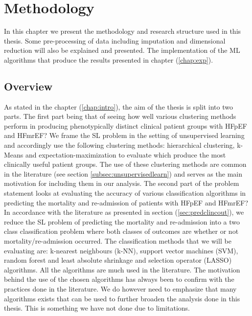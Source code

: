 \documentclass[../thesis.tex]{subfiles}
\begin{document}
\chapter{Methodology}
\label{chap:method}

\noindent In this chapter we present the methodology and research structure used in this thesis. Some pre-processing of data including imputation and dimensional reduction will also be explained and presented. The implementation of the ML algorithms that produce the results presented in chapter (\ref{chap:exp}).

\section{Overview}

\noindent As stated in the chapter (\ref{chap:intro}), the aim of the thesis is split into two parts. The first part being that of seeing how well various clustering methods perform in producing phenotypically distinct clinical patient groups with HFpEF and HFmrEF? We frame the SL problem in the setting of unsupervised learning and accordingly use the following clustering methods: hierarchical clustering, k-Means and expectation-maximization to evaluate which produce the most clinically useful patient groups. The use of these clustering methods are common in the literature (see section \ref{subsec:unsupervisedlearn}) and serves as the main motivation for including them in our analysis. The second part of the problem statement looks at evaluating the accuracy of various classification algorithms in predicting the mortality and re-admission of patients with HFpEF and HFmrEF? In accordance with the literature as presented in section (\ref{sec:predclincout}), we reduce the SL problem of predicting the mortality and re-admission into a two class classification problem where both classes of outcomes are whether or not mortality/re-admission occurred. The classification methods that we will be evaluating are: k-nearest neighbours (k-NN), support vector machines (SVM), random forest and least absolute shrinkage and selection operator (LASSO) algorithms. All the algorithms are much used in the literature. The motivation behind the use of the chosen algorithms has always been to confirm with the practices done in the literature. We do however need to emphasize that many algorithms exists that can be used to further broaden the analysis done in this thesis. This is something we have not done due to limitations.


\end{document}
